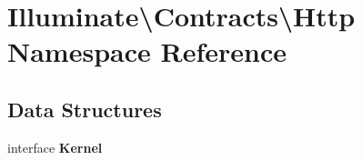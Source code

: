 \section{Illuminate\textbackslash{}Contracts\textbackslash{}Http Namespace Reference}
\label{namespace_illuminate_1_1_contracts_1_1_http}
\subsection*{Data Structures}
\begin{DoxyCompactItemize}
\item 
interface {\bf Kernel}
\end{DoxyCompactItemize}
